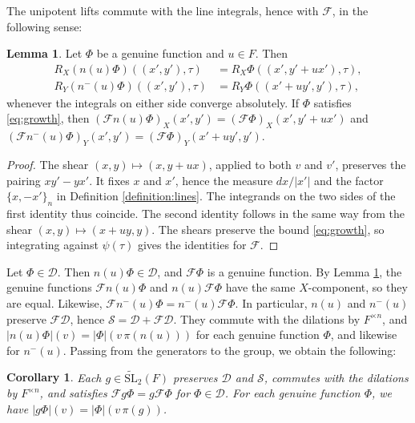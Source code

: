 \documentclass[reqno]{amsart}
\theoremstyle{plain}
\newtheorem{corollary}[theorem]{Corollary}
\theoremstyle{definition}
\theoremstyle{itplain}
\newtheorem{lemma}[theorem]{Lemma}
\numberwithin{equation}{section}
\numberwithin{theorem}{section}
\begin{document}
The unipotent lifts commute with the line integrals, hence with $\mathcal{F}$, in the following sense:
\begin{lemma}\label{lemma:unipotent-properties}
  Let $\Phi$ be a genuine function and $u \in F$.  Then
  \begin{equation}\label{eq:unipotent-lines}
    \begin{aligned}
      R_X (n(u) \Phi)((x', y'), \tau) &= R_X \Phi((x', y' + u x'), \tau), \\
      R_Y (n^-(u) \Phi)((x', y'), \tau) &= R_Y \Phi((x' + u y', y'), \tau),
    \end{aligned}
  \end{equation}
  whenever the integrals on either side converge absolutely.  If $\Phi$ satisfies \eqref{eq:growth}, then $(\mathcal{F} n(u) \Phi)_X(x', y') = (\mathcal{F} \Phi)_X(x', y' + u x')$ and $(\mathcal{F} n^-(u) \Phi)_Y(x', y') = (\mathcal{F} \Phi)_Y(x' + u y', y')$.
\end{lemma}
\begin{proof}
  The shear $(x, y) \mapsto (x, y + u x)$, applied to both $v$ and $v'$, preserves the pairing $x y' - y x'$.  It fixes $x$ and $x'$, hence the measure $d x / \lvert x' \rvert$ and the factor $\{x, -x'\}_n$ in Definition \ref{definition:lines}.  The integrands on the two sides of the first identity thus coincide.  The second identity follows in the same way from the shear $(x, y) \mapsto (x + u y, y)$.  The shears preserve the bound \eqref{eq:growth}, so integrating against $\psi(\tau)$ gives the identities for $\mathcal{F}$.
\end{proof}

Let $\Phi \in \mathcal{D}$.  Then $n(u) \Phi \in \mathcal{D}$, and $\mathcal{F} \Phi$ is a genuine function.  By Lemma \ref{lemma:unipotent-properties}, the genuine functions $\mathcal{F} n(u) \Phi$ and $n(u) \mathcal{F} \Phi$ have the same $X$-component, so they are equal.  Likewise, $\mathcal{F} n^-(u) \Phi = n^-(u) \mathcal{F} \Phi$.  In particular, $n(u)$ and $n^-(u)$ preserve $\mathcal{F} \mathcal{D}$, hence $\mathcal{S} = \mathcal{D} + \mathcal{F} \mathcal{D}$.  They commute with the dilations by $F^{\times n}$, and $\lvert n(u) \Phi \rvert(v) = \lvert \Phi \rvert(v \, \pi(n(u)))$ for each genuine function $\Phi$, and likewise for $n^-(u)$.  Passing from the generators to the group, we obtain the following:
\begin{corollary}\label{corollary:metaplectic}
  Each $g \in \widetilde{\mathrm{SL}}_2(F)$ preserves $\mathcal{D}$ and $\mathcal{S}$, commutes with the dilations by $F^{\times n}$, and satisfies $\mathcal{F} g \Phi = g \mathcal{F} \Phi$ for $\Phi \in \mathcal{D}$.  For each genuine function $\Phi$, we have $\lvert g \Phi \rvert(v) = \lvert \Phi \rvert(v \, \pi(g))$.
\end{corollary}
\end{document}
